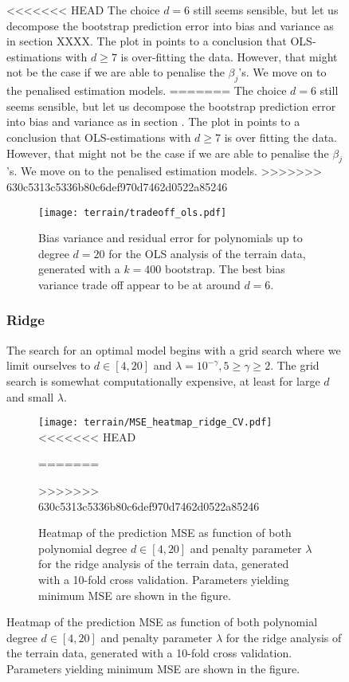 \begin{figure}
<<<<<<< HEAD
        The choice $d=6$ still seems sensible, but let us decompose the bootstrap prediction error into bias and variance as in section XXXX. The plot in  points to a conclusion that OLS-estimations with $d\geq 7$ is over-fitting the data. However, that might not be the case if we are able to penalise the $\beta_j$'s. We move on to the penalised estimation models.
=======
        The choice $d=6$ still seems sensible, but let us decompose the bootstrap prediction error into bias and variance as in section . The plot in  points to a conclusion that OLS-estimations with $d\geq 7$ is over fitting the data. However, that might not be the case if we are able to penalise the $\beta_j$'s. We move on to the penalised estimation models.
>>>>>>> 630c5313c5336b80c6def970d7462d0522a85246

        \begin{figure}
            \texttt{[image: terrain/tradeoff\_ols.pdf]}
            \caption{Bias variance and residual error for polynomials up to degree $d=20$ for the OLS analysis of the terrain data, generated with a $k=400$ bootstrap. The best bias variance trade off appear to be at around $d=6$.}
            \label{fig:gc_bias_variance_ols}
        \end{figure}


        \subsubsection{Ridge}\label{sec:gc_ridgeanalysis}


        The search for an optimal model begins with a grid search where we limit ourselves to $d\in[4, 20]$ and $\lambda=10^{-\gamma}, 5 \geq \gamma \geq 2$. The grid search is somewhat computationally expensive, at least for large $d$ and small $\lambda$.
        
        \begin{figure}
            \texttt{[image: terrain/MSE\_heatmap\_ridge\_CV.pdf]}
<<<<<<< HEAD
            \caption{Heatmap Ridge}
=======
            \caption{Heatmap of the prediction MSE as function of both polynomial degree $d\in[4,20]$ and penalty parameter $\lambda$ for the ridge analysis of the terrain data, generated with a 10-fold cross validation. Parameters yielding minimum MSE are shown in the figure. }
>>>>>>> 630c5313c5336b80c6def970d7462d0522a85246
            \label{fig:gc_gridsearch_ridge}
        \end{figure}


\end{figure}
